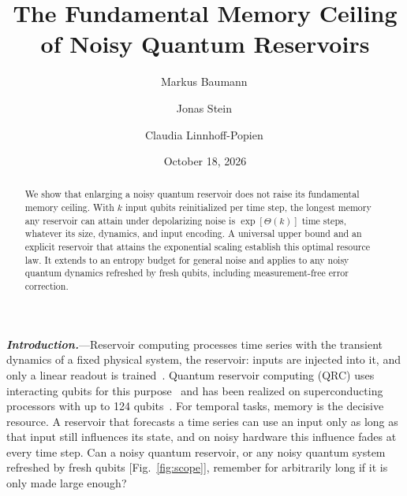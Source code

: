 \documentclass[aps,prl,twocolumn,superscriptaddress,floatfix]{revtex4-2}
\theoremstyle{plain}
\newcommand{\runin}[1]{\textit{\textbf{#1}}---}
\begin{document}
\let\SMaddcontentsline\addcontentsline
\renewcommand{\addcontentsline}[3]{}

\title{The Fundamental Memory Ceiling of Noisy Quantum Reservoirs}

\author{Markus Baumann\,}
\author{Jonas Stein\,}
\author{Claudia Linnhoff-Popien\,}

\date{October 18, 2026}

\begin{abstract}
We show that enlarging a noisy quantum reservoir does not raise its fundamental memory ceiling. With $k$ input qubits reinitialized per time step, the longest memory any reservoir can attain under depolarizing noise is $\exp[\Theta(k)]$ time steps, whatever its size, dynamics, and input encoding. A universal upper bound and an explicit reservoir that attains the exponential scaling establish this optimal resource law. It extends to an entropy budget for general noise and applies to any noisy quantum dynamics refreshed by fresh qubits, including measurement-free error correction.
\end{abstract}

\maketitle


\runin{Introduction.}Reservoir computing processes time series with the transient dynamics of a fixed physical system, the reservoir: inputs are injected into it, and only a linear readout is trained~\cite{Jaeger2001,Maass2002,JaegerHaas2004,Lukosevicius2009,Tanaka2019}. Quantum reservoir computing (QRC) uses interacting qubits for this purpose~\cite{Fujii2017,Nakajima2019,Mujal2021} and has been realized on superconducting processors with up to 124 qubits~\cite{Chen2020,Suzuki2022,Yasuda2023,Hu2024,Monzani2024,Dao2026}. For temporal tasks, memory is the decisive resource. A reservoir that forecasts a time series can use an input only as long as that input still influences its state, and on noisy hardware this influence fades at every time step. Can a noisy quantum reservoir, or any noisy quantum system refreshed by fresh qubits [Fig.~\ref{fig:scope}], remember for arbitrarily long if it is only made large enough?
\end{document}
